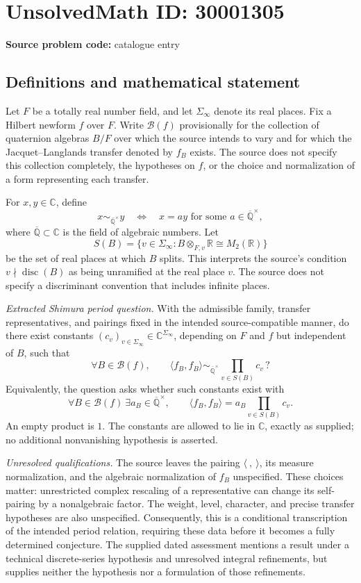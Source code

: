 \documentclass[11pt]{article}
\newcommand{\Q}{\mathbb{Q}}
\newcommand{\R}{\mathbb{R}}
\newcommand{\C}{\mathbb{C}}
\begin{document}
\section*{UnsolvedMath ID: 30001305}
\textbf{Source problem code:} catalogue entry
\subsection{Definitions and mathematical statement}
Let \(F\) be a totally real number field, and let \(\Sigma_\infty\) denote its real places. Fix a Hilbert newform \(f\) over \(F\). Write \(\mathcal B(f)\) provisionally for the collection of quaternion algebras \(B/F\) over which the source intends to vary and for which the Jacquet--Langlands transfer denoted by \(f_B\) exists. The source does not specify this collection completely, the hypotheses on \(f\), or the choice and normalization of a form representing each transfer.

For \(x,y\in\C\), define
\[
 x\sim_{\overline{\Q}^{\times}}y
 \quad\Longleftrightarrow\quad
 x=a y\text{ for some }a\in\overline{\Q}^{\times},
\]
where \(\overline{\Q}\subset\C\) is the field of algebraic numbers. Let
\[
 S(B)=\{v\in\Sigma_\infty:B\otimes_{F,v}\R\cong M_2(\R)\}
\]
be the set of real places at which \(B\) splits. This interprets the source's condition \(v\nmid\operatorname{disc}(B)\) as being unramified at the real place \(v\). The source does not specify a discriminant convention that includes infinite places.

\emph{Extracted Shimura period question.} With the admissible family, transfer representatives, and pairings fixed in the intended source-compatible manner, do there exist constants \((c_v)_{v\in\Sigma_\infty}\in\C^{\Sigma_\infty}\), depending on \(F\) and \(f\) but independent of \(B\), such that
\[
 \forall B\in\mathcal B(f),\qquad
 \langle f_B,f_B\rangle
 \sim_{\overline{\Q}^{\times}}
 \prod_{v\in S(B)}c_v\,?
\]
Equivalently, the question asks whether such constants exist with
\[
 \forall B\in\mathcal B(f)\ \exists a_B\in\overline{\Q}^{\times},\qquad
 \langle f_B,f_B\rangle=a_B\prod_{v\in S(B)}c_v.
\]
An empty product is \(1\). The constants are allowed to lie in \(\C\), exactly as supplied; no additional nonvanishing hypothesis is asserted.

\emph{Unresolved qualifications.} The source leaves the pairing \(\langle\ ,\ \rangle\), its measure normalization, and the algebraic normalization of \(f_B\) unspecified. These choices matter: unrestricted complex rescaling of a representative can change its self-pairing by a nonalgebraic factor. The weight, level, character, and precise transfer hypotheses are also unspecified. Consequently, this is a conditional transcription of the intended period relation, requiring these data before it becomes a fully determined conjecture. The supplied dated assessment mentions a result under a technical discrete-series hypothesis and unresolved integral refinements, but supplies neither the hypothesis nor a formulation of those refinements.
\end{document}

